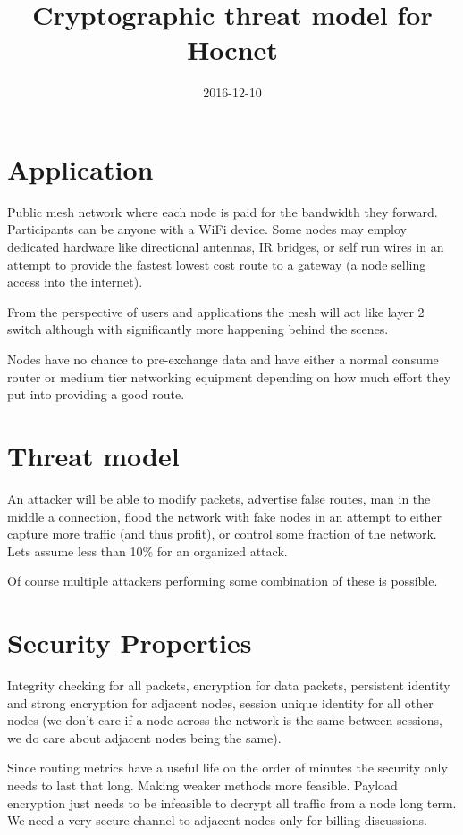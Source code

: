 \documentclass[11pt]{article}
\title{\textbf{Cryptographic threat model for Hocnet}}
\date{2016-12-10}
\begin{document}
\maketitle

\section{Application}

Public mesh network where each node is paid for the bandwidth they forward. Participants can be anyone with a WiFi device. Some nodes may employ dedicated hardware like directional antennas, IR bridges, or self run wires in an attempt to provide the fastest lowest cost route to a gateway (a node selling access into the internet). 

From the perspective of users and applications the mesh will act like layer 2 switch although with significantly more happening behind the scenes. 

Nodes have no chance to pre-exchange data and have either a normal consume router or medium tier networking equipment depending on how much effort they put into providing a good route.

\section{Threat model}

An attacker will be able to modify packets, advertise false routes, man in the middle a connection, flood the network with fake nodes in an attempt to either capture more traffic (and thus profit), or control some fraction of the network. Lets assume less than 10\% for an organized attack.

Of course multiple attackers performing some combination of these is possible.  

\section{Security Properties}

Integrity checking for all packets, encryption for data packets, persistent identity and strong encryption for adjacent nodes, session unique identity for all other nodes (we don't care if a node across the network is the same between sessions, we do care about adjacent nodes being the same). 

Since routing metrics have a useful life on the order of minutes the security only needs to last that long. Making weaker methods more feasible. Payload encryption just needs to be infeasible to decrypt all traffic from a node long term. We need a very secure channel to adjacent nodes only for billing discussions. 
\end{document}
